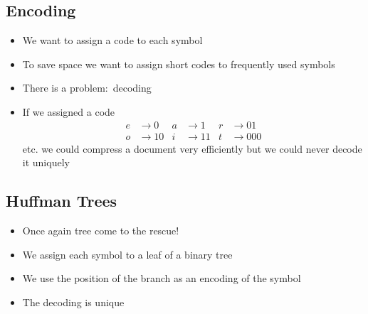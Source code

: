 \begin{slide}
\section[-2]{Encoding}

\begin{PauseHighLight}
  \begin{itemize}
  \item We want to assign a code to each symbol\pause
  \item To save space we want to assign short codes to frequently used
    symbols\pause
  \item There is a problem:\pause\ decoding\pause
  \item If we assigned a code
    \begin{align*}
      e& \rightarrow 0 & a &\rightarrow 1 & r &\rightarrow 01 \\
      o& \rightarrow 10 & i &\rightarrow 11 & t &\rightarrow 000
    \end{align*}
    etc.  we could compress a document very efficiently but we could
    never decode it uniquely\pause
  \end{itemize}
\end{PauseHighLight}

\end{slide}


\begin{slide}
\section[-2.5]{Huffman Trees}

\begin{PauseHighLight}
  \begin{itemize}\squeeze
  \item Once again tree come to the rescue!\pause
  \item We assign each symbol to a leaf of a binary tree\pause
  \item We use the position of the branch as an encoding of the symbol\pause
    \begin{center}
      \pause
    \end{center}
  \item The decoding is unique\pause
  \end{itemize}
\end{PauseHighLight}

\end{slide}

